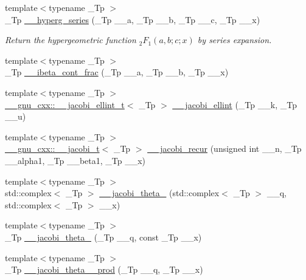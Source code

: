 \begin{DoxyCompactItemize}
{\footnotesize template$<$typename \+\_\+\+Tp $>$ }\\\+\_\+\+Tp \hyperlink{namespacestd_1_1____detail_ad234e0d31f55cd3748169dccb2533c6a}{\+\_\+\+\_\+hyperg\+\_\+series} (\+\_\+\+Tp \+\_\+\+\_\+a, \+\_\+\+Tp \+\_\+\+\_\+b, \+\_\+\+Tp \+\_\+\+\_\+c, \+\_\+\+Tp \+\_\+\+\_\+x)
\begin{DoxyCompactList}\small\item\em Return the hypergeometric function $ {}_2F_1(a,b;c;x) $ by series expansion. \end{DoxyCompactList}\item 
{\footnotesize template$<$typename \+\_\+\+Tp $>$ }\\\+\_\+\+Tp \hyperlink{namespacestd_1_1____detail_a96a5a5205553de07f98b89b2e1f18000}{\+\_\+\+\_\+ibeta\+\_\+cont\+\_\+frac} (\+\_\+\+Tp \+\_\+\+\_\+a, \+\_\+\+Tp \+\_\+\+\_\+b, \+\_\+\+Tp \+\_\+\+\_\+x)
\item 
{\footnotesize template$<$typename \+\_\+\+Tp $>$ }\\\hyperlink{struct____gnu__cxx_1_1____jacobi__ellint__t}{\+\_\+\+\_\+gnu\+\_\+cxx\+::\+\_\+\+\_\+jacobi\+\_\+ellint\+\_\+t}$<$ \+\_\+\+Tp $>$ \hyperlink{namespacestd_1_1____detail_a9530210ed172894f6a2e2bf4ef7fd47d}{\+\_\+\+\_\+jacobi\+\_\+ellint} (\+\_\+\+Tp \+\_\+\+\_\+k, \+\_\+\+Tp \+\_\+\+\_\+u)
\item 
{\footnotesize template$<$typename \+\_\+\+Tp $>$ }\\\hyperlink{struct____gnu__cxx_1_1____jacobi__t}{\+\_\+\+\_\+gnu\+\_\+cxx\+::\+\_\+\+\_\+jacobi\+\_\+t}$<$ \+\_\+\+Tp $>$ \hyperlink{namespacestd_1_1____detail_a35edf888e09012d7059e690507ef42ad}{\+\_\+\+\_\+jacobi\+\_\+recur} (unsigned int \+\_\+\+\_\+n, \+\_\+\+Tp \+\_\+\+\_\+alpha1, \+\_\+\+Tp \+\_\+\+\_\+beta1, \+\_\+\+Tp \+\_\+\+\_\+x)
\item 
{\footnotesize template$<$typename \+\_\+\+Tp $>$ }\\std\+::complex$<$ \+\_\+\+Tp $>$ \hyperlink{namespacestd_1_1____detail_aa6cd18ad2e630e4d412007bf2371fb34}{\+\_\+\+\_\+jacobi\+\_\+theta\+\_} (std\+::complex$<$ \+\_\+\+Tp $>$ \+\_\+\+\_\+q, std\+::complex$<$ \+\_\+\+Tp $>$ \+\_\+\+\_\+x)
\item 
{\footnotesize template$<$typename \+\_\+\+Tp $>$ }\\\+\_\+\+Tp \hyperlink{namespacestd_1_1____detail_af98af6bb3dd83f6a28c777d8fbaa5e51}{\+\_\+\+\_\+jacobi\+\_\+theta\+\_} (\+\_\+\+Tp \+\_\+\+\_\+q, const \+\_\+\+Tp \+\_\+\+\_\+x)
\item 
{\footnotesize template$<$typename \+\_\+\+Tp $>$ }\\\+\_\+\+Tp \hyperlink{namespacestd_1_1____detail_a6283a61803d2bc02eebf1d1a12b1bb52}{\+\_\+\+\_\+jacobi\+\_\+theta\+\_\+\_\+prod} (\+\_\+\+Tp \+\_\+\+\_\+q, \+\_\+\+Tp \+\_\+\+\_\+x)

\end{DoxyCompactItemize}
